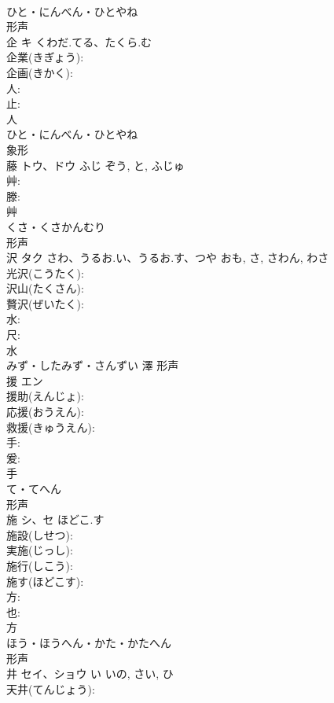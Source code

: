 \documentclass[8pt]{extreport}
\begin{document}
\begin{CJK}{UTF8}{min}
\\	ひと・にんべん・ひとやね	
\\	形声 
\\	企	キ	くわだ.てる、たくら.む		
\\	企業(きぎょう): 
\\	企画(きかく): 
\\	人: 
\\	止: 
\\	人	
\\	ひと・にんべん・ひとやね	
\\	象形 
\\	藤	トウ、ドウ	ふじ	ぞう, と, ふじゅ	
\\	艸: 
\\	滕: 
\\	艸	
\\	くさ・くさかんむり	
\\	形声 
\\	沢	タク	さわ、うるお.い、うるお.す、つや	おも, さ, さわん, わさ	
\\	光沢(こうたく): 
\\	沢山(たくさん): 
\\	贅沢(ぜいたく): 
\\	水: 
\\	尺: 
\\	水	
\\	みず・したみず・さんずい	澤	形声 
\\	援	エン			
\\	援助(えんじょ): 
\\	応援(おうえん): 
\\	救援(きゅうえん): 
\\	手: 
\\	爰: 
\\	手	
\\	て・てへん	
\\	形声 
\\	施	シ、セ	ほどこ.す		
\\	施設(しせつ): 
\\	実施(じっし): 
\\	施行(しこう): 
\\	施す(ほどこす): 
\\	方: 
\\	也: 
\\	方	
\\	ほう・ほうへん・かた・かたへん	
\\	形声 
\\	井	セイ、ショウ	い	いの, さい, ひ	
\\	天井(てんじょう): 

\end{CJK}
\end{document}
